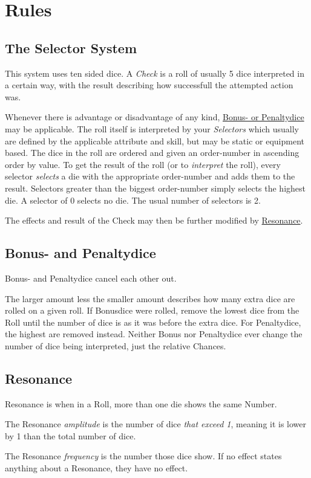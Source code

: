 \chapter{Rules}\label{ch:rules}
\section{The Selector System}\label{sec:selectorsystem}
This system uses ten sided dice.
A \emph{Check} is a roll of usually 5 dice interpreted in a certain way,
with the result describing how successfull the attempted action was.\par
Whenever there is advantage or disadvantage of any kind,
\hyperref[sec:bonus--and-penaltydice]{Bonus- or Penaltydice} may be applicable.
The roll itself is interpreted by your \emph{Selectors} which usually are defined
by the applicable attribute and skill, but may be static or equipment based.
The dice in the roll are ordered and given an order-number in ascending order by value.
To get the result of the roll (or to \emph{interpret} the roll), every selector \emph{selects} a die with the
appropriate order-number and adds them to the result.
Selectors greater than the biggest order-number simply selects the highest die.
A selector of 0 selects no die.
The usual number of selectors is 2.\par
The effects and result of the Check may then be further modified by \hyperref[sec:resonance]{Resonance}.

\section{Bonus- and Penaltydice}\label{sec:bonus--and-penaltydice}
Bonus- and Penaltydice cancel each other out.\par
The larger amount less the smaller amount describes how many extra dice are rolled on a given roll.
If Bonusdice were rolled,
remove the lowest dice from the Roll until the number of dice is as it was before the extra dice.
For Penaltydice, the highest are removed instead.
Neither Bonus nor Penaltydice ever change the number of dice being interpreted, just the relative Chances.

\section{Resonance}\label{sec:resonance}
Resonance is when in a Roll, more than one die shows the same Number.\par
The Resonance \emph{amplitude} is the number of dice \emph{that exceed 1}, meaning it is lower by 1 than the total
number of dice.\par
The Resonance \emph{frequency} is the number those dice show.
If no effect states anything about a Resonance, they have no effect.

